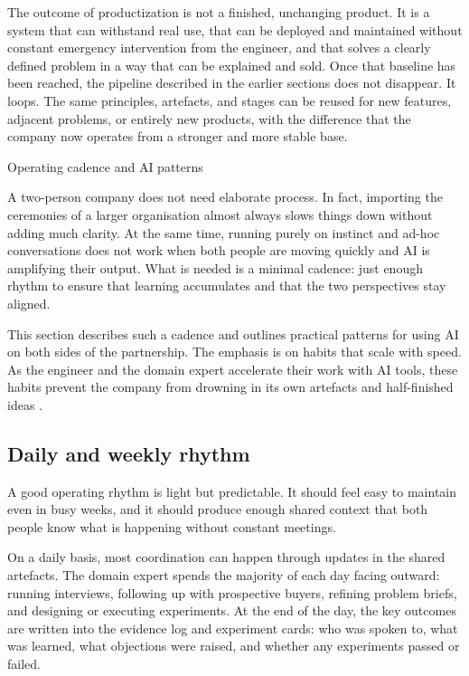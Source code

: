 \documentclass[10pt, a4paper, twocolumn]{article} %
\makeatletter
\let\orig@section\section %
\renewcommand{\section}{%
  \@ifstar{\orig@section*}{\unnumberedsteppingsection}%
}
\newcommand{\unnumberedsteppingsection}[1]{%
  \refstepcounter{section}%
  \orig@section*{#1}%
}
\makeatother
\begin{document}
The outcome of productization is not a finished, unchanging product. It is a system that can withstand real use, that can be deployed and maintained without constant emergency intervention from the engineer, and that solves a clearly defined problem in a way that can be explained and sold. Once that baseline has been reached, the pipeline described in the earlier sections does not disappear. It loops. The same principles, artefacts, and stages can be reused for new features, adjacent problems, or entirely new products, with the difference that the company now operates from a stronger and more stable base.





\clearpage


\section{Operating cadence and AI patterns}

A two-person company does not need elaborate process. In fact, importing the ceremonies of a larger organisation almost always slows things down without adding much clarity. At the same time, running purely on instinct and ad-hoc conversations does not work when both people are moving quickly and AI is amplifying their output. What is needed is a minimal cadence: just enough rhythm to ensure that learning accumulates and that the two perspectives stay aligned.

This section describes such a cadence and outlines practical patterns for using AI on both sides of the partnership. The emphasis is on habits that scale with speed. As the engineer and the domain expert accelerate their work with AI tools, these habits prevent the company from drowning in its own artefacts and half-finished ideas \citep{forsgren2018accelerate,blomgren2025coordination}.

\newpage
\subsection{Daily and weekly rhythm}

A good operating rhythm is light but predictable. It should feel easy to maintain even in busy weeks, and it should produce enough shared context that both people know what is happening without constant meetings.

On a daily basis, most coordination can happen through updates in the shared artefacts. The domain expert spends the majority of each day facing outward: running interviews, following up with prospective buyers, refining problem briefs, and designing or executing experiments. At the end of the day, the key outcomes are written into the evidence log and experiment cards: who was spoken to, what was learned, what objections were raised, and whether any experiments passed or failed.
\end{document}
